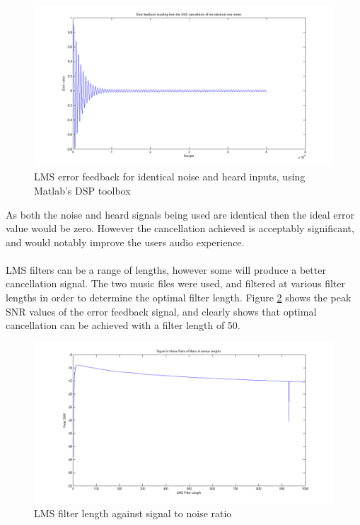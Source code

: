 \begin{figure}[H]
	\centering
	\includegraphics[width=\textwidth]{./img/lmssnr_cancel.png}
	\caption{LMS error feedback for identical noise and heard inputs, using Matlab's DSP toolbox}
	\label{fig:modellmscancel}
\end{figure}

\noindent As both the noise and heard signals being used are identical then the ideal error value would be zero.
However the cancellation achieved is acceptably significant, and would notably improve the users audio experience.
\\
\\
LMS filters can be a range of lengths, however some will produce a better cancellation signal.
The two music files were used, and filtered at various filter lengths in order to determine the optimal filter length.
Figure \ref{fig:modellmsfiltlen} shows the peak SNR values of the error feedback signal, and clearly shows that optimal cancellation can be achieved with a filter length of 50.

\begin{figure}[H]
	\centering
	\includegraphics[width=\textwidth]{./img/lmssnr_graph.png}
	\caption{LMS filter length against signal to noise ratio}
	\label{fig:modellmsfiltlen}
\end{figure}

